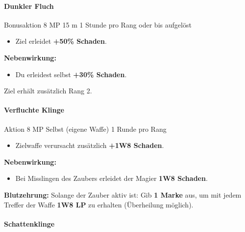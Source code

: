 \paragraph*{Dunkler Fluch}

\spellcard
{}
{Bonusaktion}
{8 MP}
{15 m}
{1 Stunde pro Rang oder bis aufgelöst}
{
	\begin{itemize}
		\item Ziel erleidet \textbf{+50\% Schaden}.
	\end{itemize}
	
	\medskip
	\textbf{Nebenwirkung:}
	\begin{itemize}
		\item Du erleidest selbst \textbf{+30\% Schaden}.
	\end{itemize}
}
{
	Ziel erhält zusätzlich  Rang 2.
}

\paragraph*{Verfluchte Klinge}

\spellcard
{}
{Aktion}
{8 MP}
{Selbst (eigene Waffe)}
{1 Runde pro Rang}
{
	\begin{itemize}
		\item Zielwaffe verursacht zusätzlich \textbf{+1W8 Schaden}.
	\end{itemize}
	
	\medskip
	\textbf{Nebenwirkung:}
	\begin{itemize}
		\item Bei Misslingen des Zaubers erleidet der Magier \textbf{1W8 Schaden}.
	\end{itemize}
}
{
	\textbf{Blutzehrung:}
	Solange der Zauber aktiv ist: Gib \textbf{1 Marke} aus, um mit jedem Treffer der Waffe \textbf{1W8 LP} zu erhalten (Überheilung möglich).
}

\paragraph*{Schattenklinge}

